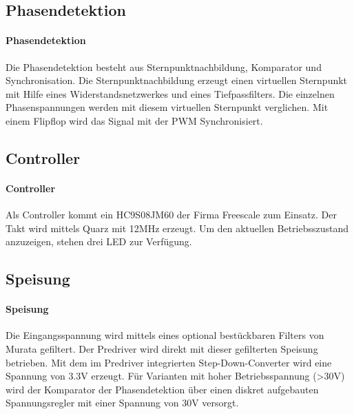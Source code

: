 \ifSTANDALONE
\subsection{Phasendetektion}
\fi
\ifEMBED
\paragraph{Phasendetektion}$~~$\vspace{2mm}\\
\fi
Die Phasendetektion besteht aus Sternpunktnachbildung, Komparator und 
Synchronisation. Die Sternpunktnachbildung erzeugt einen virtuellen Sternpunkt 
mit Hilfe eines Widerstandsnetzwerkes und eines Tiefpassfilters. Die einzelnen 
Phasenspannungen werden mit diesem virtuellen Sternpunkt verglichen. Mit einem 
Flipflop wird das Signal mit der PWM Synchronisiert. 

\ifSTANDALONE
\subsection{Controller}
\fi
\ifEMBED
\paragraph{Controller}$~~$\vspace{2mm}\\
\fi
Als Controller kommt ein HC9S08JM60 der Firma Freescale zum Einsatz. Der Takt 
wird mittels Quarz mit 12MHz erzeugt. Um den aktuellen Betriebsszustand 
anzuzeigen, stehen drei LED zur Verfügung. 

\ifSTANDALONE
\subsection{Speisung}
\fi
\ifEMBED
\paragraph{Speisung}$~~$\vspace{2mm}\\
\fi
Die Eingangsspannung wird mittels eines optional bestückbaren Filters von 
Murata gefiltert. Der Predriver wird direkt mit dieser gefilterten Speisung 
betrieben. Mit dem im Predriver integrierten Step-Down-Converter wird eine 
Spannung von 3.3\si{\volt} erzeugt. Für Varianten mit hoher Betriebsspannung (>30\si{\volt}) 
wird der Komparator der Phasendetektion über einen diskret aufgebauten 
Spannungsregler mit einer Spannung von 30\si{\volt} versorgt. 

